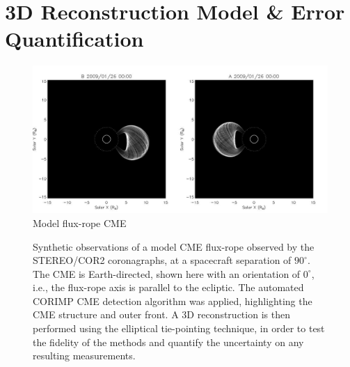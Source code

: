 \documentclass[preprint2]{aastex}
\begin{document}
\section{3D Reconstruction Model \& Error Quantification}


\begin{figure}[ht]
\includegraphics[scale=0.2, trim=0 0 0 0, clip=true]{images/fluxropemodel.jpg}
\caption{Model flux-rope CME}
\label{fluxropemodel}
\end{figure}

\begin{figure}[!ht]
\caption{Synthetic observations of a model CME flux-rope observed by the STEREO/COR2 coronagraphs, at a spacecraft separation of $90^{\circ}$. The CME is Earth-directed, shown here with an orientation of $0^{\circ}$, i.e., the flux-rope axis is parallel to the ecliptic. The automated CORIMP CME detection algorithm was applied, highlighting the CME structure and outer front. A 3D reconstruction is then performed using the elliptical tie-pointing technique, in order to test the fidelity of the methods and quantify the uncertainty on any resulting measurements.}
\label{dets_splice}
\end{figure}
\end{document}
